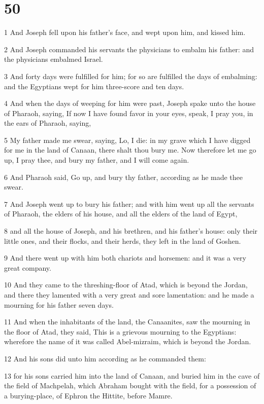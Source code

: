 \chapter{50}

\par 1 And Joseph fell upon his father's face, and wept upon him, and kissed him.
\par 2 And Joseph commanded his servants the physicians to embalm his father: and the physicians embalmed Israel.
\par 3 And forty days were fulfilled for him; for so are fulfilled the days of embalming: and the Egyptians wept for him three-score and ten days.
\par 4 And when the days of weeping for him were past, Joseph spake unto the house of Pharaoh, saying, If now I have found favor in your eyes, speak, I pray you, in the ears of Pharaoh, saying,
\par 5 My father made me swear, saying, Lo, I die: in my grave which I have digged for me in the land of Canaan, there shalt thou bury me. Now therefore let me go up, I pray thee, and bury my father, and I will come again.
\par 6 And Pharaoh said, Go up, and bury thy father, according as he made thee swear.
\par 7 And Joseph went up to bury his father; and with him went up all the servants of Pharaoh, the elders of his house, and all the elders of the land of Egypt,
\par 8 and all the house of Joseph, and his brethren, and his father's house: only their little ones, and their flocks, and their herds, they left in the land of Goshen.
\par 9 And there went up with him both chariots and horsemen: and it was a very great company.
\par 10 And they came to the threshing-floor of Atad, which is beyond the Jordan, and there they lamented with a very great and sore lamentation: and he made a mourning for his father seven days.
\par 11 And when the inhabitants of the land, the Canaanites, saw the mourning in the floor of Atad, they said, This is a grievous mourning to the Egyptians: wherefore the name of it was called Abel-mizraim, which is beyond the Jordan.
\par 12 And his sons did unto him according as he commanded them:
\par 13 for his sons carried him into the land of Canaan, and buried him in the cave of the field of Machpelah, which Abraham bought with the field, for a possession of a burying-place, of Ephron the Hittite, before Mamre.
